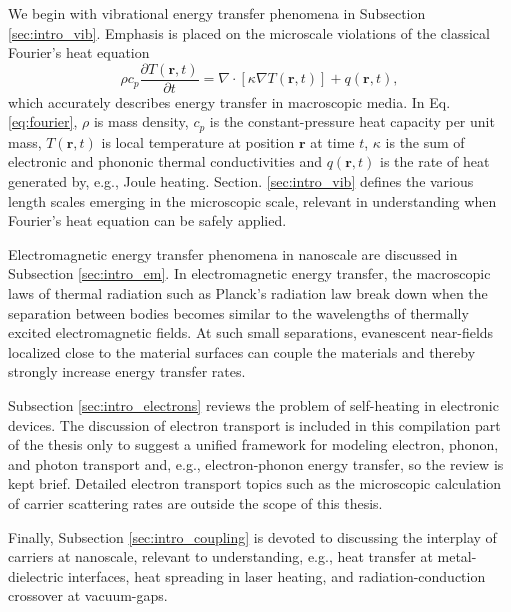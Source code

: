 We begin with vibrational energy transfer phenomena in Subsection \ref{sec:intro_vib}. Emphasis is placed on the microscale violations of the classical Fourier's heat equation \cite{fetter}
\begin{equation}
 \rho c_p \frac{\partial T(\mathbf{r},t)}{\partial t} =  \nabla \cdot [\kappa \nabla T(\mathbf{r},t)] + q(\mathbf{r},t), \label{eq:fourier}
\end{equation}
which accurately describes energy transfer in macroscopic media. In Eq. \eqref{eq:fourier}, $\rho$ is mass density, $c_p$ is the constant-pressure heat capacity per unit mass, $T(\mathbf{r},t)$ is local temperature at position $\mathbf{r}$ at time $t$, $\kappa$ is the sum of electronic and phononic thermal conductivities and $q(\mathbf{r},t)$ is the rate of heat generated by, e.g., Joule heating. Section. \ref{sec:intro_vib} defines the various length scales emerging in the microscopic scale, relevant in understanding when Fourier's heat equation can be safely applied. 

Electromagnetic energy transfer phenomena in nanoscale are discussed in Subsection \ref{sec:intro_em}. In electromagnetic energy transfer, the macroscopic laws of thermal radiation such as Planck's radiation law break down when the separation between bodies becomes similar to the wavelengths of thermally excited electromagnetic fields. At such small separations, evanescent near-fields localized close to the material surfaces can couple the materials and thereby strongly increase energy transfer rates. 

Subsection \ref{sec:intro_electrons} reviews the problem of self-heating in electronic devices. The discussion of electron transport is included in this compilation part of the thesis only to suggest a unified framework for modeling electron, phonon, and photon transport and, e.g., electron-phonon energy transfer, so the review is kept brief. Detailed electron transport topics such as the microscopic calculation of carrier scattering rates \cite{ziman} are outside the scope of this thesis.  %

Finally, Subsection \ref{sec:intro_coupling} is devoted to discussing the interplay of carriers at nanoscale, relevant to understanding, e.g., heat transfer at metal-dielectric interfaces, heat spreading in laser heating, and radiation-conduction crossover at vacuum-gaps.


